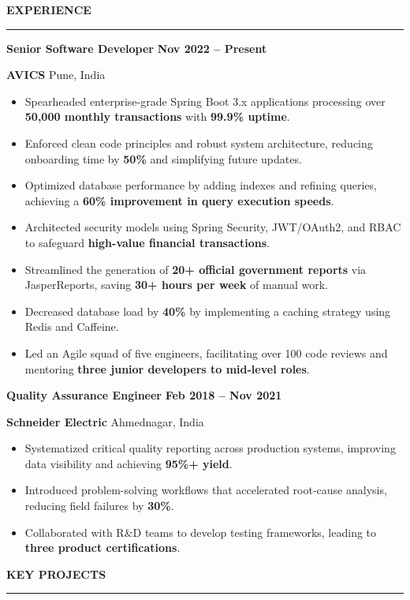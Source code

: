 \documentclass[8pt,a4paper,withhyper]{altacv}
\renewcommand{\cvsectionfont}{\large\rmfamily\bfseries}
\renewcommand{\cvevent}[4]{%
  {\large\color{emphasis}\textbf{#1}} \ifstrequal{#3}{}{}{\hfill {\normalsize\textbf{\color{accent}#3}}} \par
  \vspace{2pt}
  \ifstrequal{#2}{}{}{%
    {\normalsize\textbf{\color{body}#2}} \ifstrequal{#4}{}{}{\hfill {\normalsize\color{body}#4}} \par
  }%
  \vspace{4pt}\normalsize
}
\renewcommand{\cvsection}[2][]{%
  \nointerlineskip\bigskip%
  {\color{heading}\cvsectionfont\MakeUppercase{#2}}\\[-1ex]%
  {\color{headingrule}\rule{\linewidth}{1.2pt}\par}\medskip
}
\begin{document}
\cvsection{Experience}
\vspace{-2pt}

\cvevent{Senior Software Developer}{AVICS}{Nov 2022 -- Present}{Pune, India}
\begin{itemize}
\item Spearheaded enterprise-grade Spring Boot 3.x applications processing over \textbf{50,000 monthly transactions} with \textbf{99.9\% uptime}.
\item Enforced clean code principles and robust system architecture, reducing onboarding time by \textbf{50\%} and simplifying future updates.
\item Optimized database performance by adding indexes and refining queries, achieving a \textbf{60\% improvement in query execution speeds}.
\item Architected security models using Spring Security, JWT/OAuth2, and RBAC to safeguard \textbf{high-value financial transactions}.
\item Streamlined the generation of \textbf{20+ official government reports} via JasperReports, saving \textbf{30+ hours per week} of manual work.
\item Decreased database load by \textbf{40\%} by implementing a caching strategy using Redis and Caffeine.
\item Led an Agile squad of five engineers, facilitating over 100 code reviews and mentoring \textbf{three junior developers to mid-level roles}.
\end{itemize}

\vspace{4pt}{\color{body!30}\hrule}\vspace{4pt}

\cvevent{Quality Assurance Engineer}{Schneider Electric}{Feb 2018 -- Nov 2021}{Ahmednagar, India}
\begin{itemize}
\item Systematized critical quality reporting across production systems, improving data visibility and achieving \textbf{95\%+ yield}.
\item Introduced problem-solving workflows that accelerated root-cause analysis, reducing field failures by \textbf{30\%}.
\item Collaborated with R\&D teams to develop testing frameworks, leading to \textbf{three product certifications}.
\end{itemize}

\cvsection{Key Projects}
\vspace{-2pt}
\end{document}

